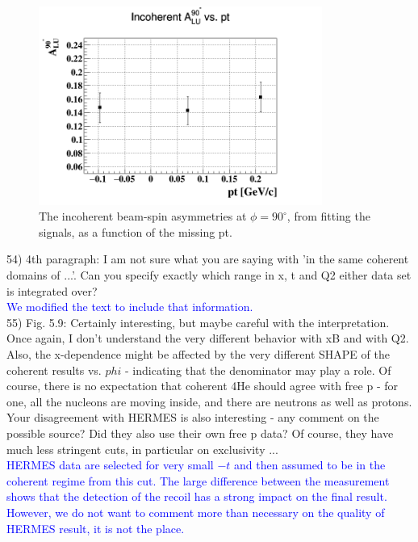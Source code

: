  \begin{figure}[tbp]
  \centering
  \includegraphics[height=6.5cm]{fig/incoh_PT_alpha.png}
  \caption{The incoherent beam-spin asymmetries at $\phi = 90 ^{\circ}$, from 
  fitting the signals, as a function of the missing pt.}
  \label{fig:alu_alpha_bins_pt}
 \end{figure}

54) 4th paragraph: I am not sure what you are saying with 'in the same coherent 
domains of ...'. Can you specify exactly which range in x, t and Q2 either data 
set is integrated over?\\
\textcolor{blue}{We modified the text to include that information. }\\

55) Fig. 5.9: Certainly interesting, but maybe careful with the interpretation.  
Once again, I don't understand the very different behavior with xB and with Q2.  
Also, the x-dependence might be affected by the very different SHAPE of the 
coherent results vs. $phi$ - indicating that the denominator may play a role. Of 
course, there is no expectation that coherent 4He should agree with free p - 
for one, all the nucleons are moving inside, and there are neutrons as well as 
protons.  Your disagreement with HERMES is also interesting - any comment on 
the possible source? Did they also use their own free p data? Of course, they 
have much less stringent cuts, in particular on exclusivity ... \\
\textcolor{blue}{HERMES data are selected for very small $-t$ and then assumed
to be in the coherent regime from this cut. The large difference between the 
measurement shows that the detection of the recoil has a strong impact on the 
final result. However, we do not want to comment more than necessary on the 
quality of HERMES result, it is not the place.}\\


\section*{}

